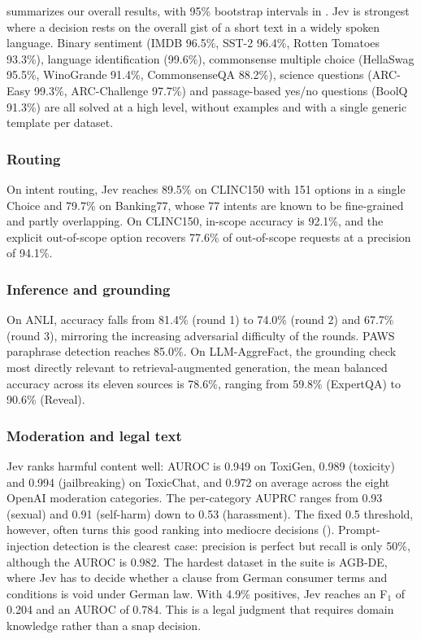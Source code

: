 \documentclass[table]{article}
\begin{document}

 summarizes our overall results, with 95\% bootstrap intervals in . Jev is strongest where a decision rests on the overall gist of a short text in a widely spoken language. Binary sentiment (IMDB 96.5\%, SST-2 96.4\%, Rotten Tomatoes 93.3\%), language identification (99.6\%), commonsense multiple choice (HellaSwag 95.5\%, WinoGrande 91.4\%, CommonsenseQA 88.2\%), science questions (ARC-Easy 99.3\%, ARC-Challenge 97.7\%) and passage-based yes/no questions (BoolQ 91.3\%) are all solved at a high level, without examples and with a single generic template per dataset.

\subsubsection{Routing}
On intent routing, Jev reaches 89.5\% on CLINC150 with 151 options in a single Choice and 79.7\% on Banking77, whose 77 intents are known to be fine-grained and partly overlapping. On CLINC150, in-scope accuracy is 92.1\%, and the explicit out-of-scope option recovers 77.6\% of out-of-scope requests at a precision of 94.1\%.

\subsubsection{Inference and grounding}
On ANLI, accuracy falls from 81.4\% (round 1) to 74.0\% (round 2) and 67.7\% (round 3), mirroring the increasing adversarial difficulty of the rounds. PAWS paraphrase detection reaches 85.0\%. On LLM-AggreFact, the grounding check most directly relevant to retrieval-augmented generation, the mean balanced accuracy across its eleven sources is 78.6\%, ranging from 59.8\% (ExpertQA) to 90.6\% (Reveal).

\subsubsection{Moderation and legal text}
Jev ranks harmful content well: AUROC is 0.949 on ToxiGen, 0.989 (toxicity) and 0.994 (jailbreaking) on ToxicChat, and 0.972 on average across the eight OpenAI moderation categories. The per-category AUPRC ranges from 0.93 (sexual) and 0.91 (self-harm) down to 0.53 (harassment). The fixed 0.5 threshold, however, often turns this good ranking into mediocre decisions (). Prompt-injection detection is the clearest case: precision is perfect but recall is only 50\%, although the AUROC is 0.982. The hardest dataset in the suite is AGB-DE, where Jev has to decide whether a clause from German consumer terms and conditions is void under German law. With 4.9\% positives, Jev reaches an F$_\text{1}$ of 0.204 and an AUROC of 0.784. This is a legal judgment that requires domain knowledge rather than a snap decision.
\end{document}
